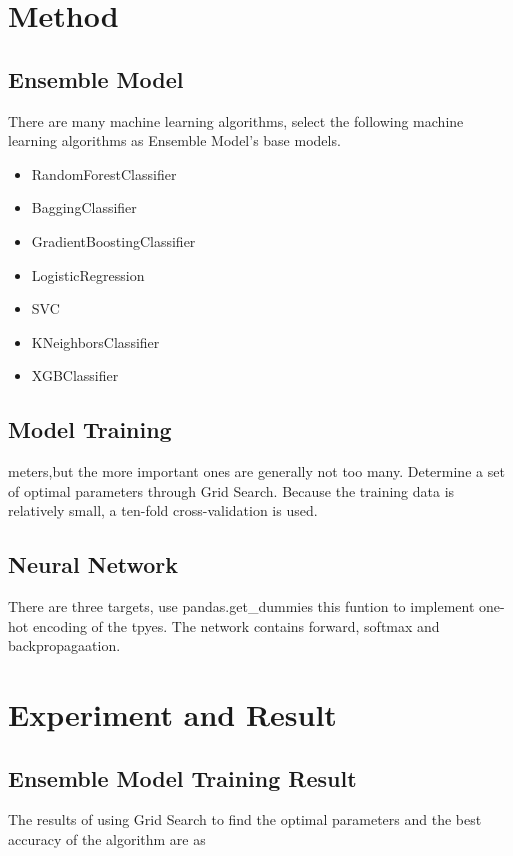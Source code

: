 \section{Method}

\subsection{Ensemble Model}
There are many machine learning algorithms, 
select the following machine learning algorithms as Ensemble Model’s base models. 

\begin{itemize}
	\item RandomForestClassifier
	\item BaggingClassifier
	\item GradientBoostingClassifier
	\item LogisticRegression
	\item SVC
	\item KNeighborsClassifier 
	\item XGBClassifier
\end{itemize}

\subsection{Model Training}
meters,but the more important ones are generally not too many. Determine a set of optimal parameters through Grid Search. Because the training data is relatively small, a ten-fold cross-validation is used. %

\subsection{Neural Network}
There are three targets, 
use pandas.get_dummies this funtion to implement one-hot encoding of the tpyes.
The network contains forward, 
softmax and backpropagaation.


\section{Experiment and Result}

\subsection{Ensemble Model Training Result}

The results of using Grid Search to find the optimal parameters and the best accuracy of the algorithm are as 
 
